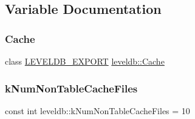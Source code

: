 \subsection{Variable Documentation}
\mbox{\label{namespaceleveldb_ac101abd3dff045f25ff9b8aa474e8403}} 
\subsubsection{\texorpdfstring{Cache}{Cache}}
{\footnotesize\ttfamily class \mbox{\hyperlink{export_8h_a658cd25b9dd114d894ae8ce9dddb7d3a}{L\+E\+V\+E\+L\+D\+B\+\_\+\+E\+X\+P\+O\+RT}} \mbox{\hyperlink{classleveldb_1_1_cache}{leveldb\+::\+Cache}}}

\mbox{\label{namespaceleveldb_a550686b2c442f4c3011d68dd12c38662}} 
\subsubsection{\texorpdfstring{kNumNonTableCacheFiles}{kNumNonTableCacheFiles}}
{\footnotesize\ttfamily const int leveldb\+::k\+Num\+Non\+Table\+Cache\+Files = 10}

